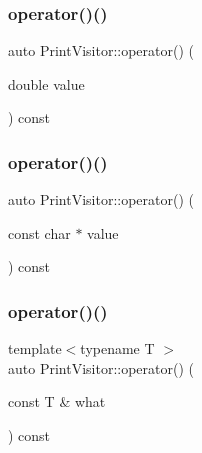 \mbox{\label{struct_print_visitor_a5e2fc45c187b641a12420f4c3cce0a25}} 
\subsubsection{\texorpdfstring{operator()()}{operator()()}\hspace{0.1cm}{\footnotesize\ttfamily [36/38]}}
{\footnotesize\ttfamily auto Print\+Visitor\+::operator() (\begin{DoxyParamCaption}\item[{double}]{value }\end{DoxyParamCaption}) const\hspace{0.3cm}{\ttfamily [inline]}}

\mbox{\label{struct_print_visitor_ae440fc88025c0dd39e9c8aa8b29394fa}} 
\subsubsection{\texorpdfstring{operator()()}{operator()()}\hspace{0.1cm}{\footnotesize\ttfamily [37/38]}}
{\footnotesize\ttfamily auto Print\+Visitor\+::operator() (\begin{DoxyParamCaption}\item[{const char $\ast$}]{value }\end{DoxyParamCaption}) const\hspace{0.3cm}{\ttfamily [inline]}}

\mbox{\label{struct_print_visitor_ae6fa94fb3d82551ef22ab2012a0bf0b9}} 
\subsubsection{\texorpdfstring{operator()()}{operator()()}\hspace{0.1cm}{\footnotesize\ttfamily [38/38]}}
{\footnotesize\ttfamily template$<$typename T $>$ \\
auto Print\+Visitor\+::operator() (\begin{DoxyParamCaption}\item[{const T \&}]{what }\end{DoxyParamCaption}) const\hspace{0.3cm}{\ttfamily [inline]}}



